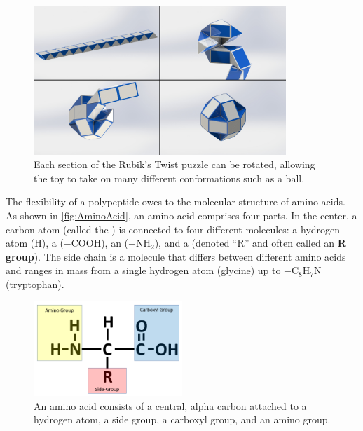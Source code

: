 \begin{figure}[h]
	\centering
	\mySfFamily
	\includegraphics[width = 0.85\textwidth]{../images/rubiks_twist_four_panel.jpg}
	\caption{Each section of the Rubik's Twist puzzle can be rotated, allowing the toy to take on many different conformations such as a ball.}
	\label{fig:rubiks_twist_four_panel}
\end{figure}

The flexibility of a polypeptide owes to the molecular structure of amino acids. As shown in \autoref{fig:AminoAcid}, an amino acid comprises four parts. In the center, a carbon atom (called the ) is connected to four different molecules: a hydrogen atom (H), a  ($-\text{COOH}$), an  ($-\text{NH}_2$), and a  (denoted ``R'' and often called an \textbf{R group}). The side chain is a molecule that differs between different amino acids and ranges in mass from a single hydrogen atom (glycine) up to $-\text{C}_8\text{H}_7\text{N}$ (tryptophan).\\

\begin{figure}[h]
	\centering
	\mySfFamily
	\includegraphics[width = 0.5\textwidth]{../images/AminoAcid.png}
	\caption{An amino acid consists of a central, alpha carbon attached to a hydrogen atom, a side group, a carboxyl group, and an amino group.}
	\label{fig:AminoAcid}
\end{figure}

